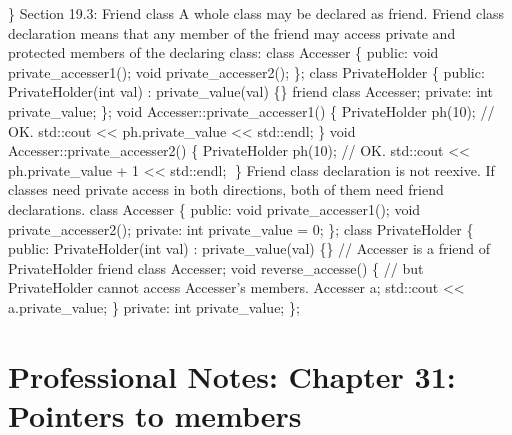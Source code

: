 \} Section 19.3: Friend class A whole class may be declared as friend.
Friend class declaration means that any member of the friend may access
private and protected members of the declaring class: class Accesser \{
public: void private\_accesser1(); void private\_accesser2(); \}; class
PrivateHolder \{ public: PrivateHolder(int val) : private\_value(val)
\{\} friend class Accesser; private: int private\_value; \}; void
Accesser::private\_accesser1() \{ PrivateHolder ph(10); // OK. std::cout
\textless\textless{} ph.private\_value \textless\textless{} std::endl;
\} void Accesser::private\_accesser2() \{ PrivateHolder ph(10); // OK.
std::cout \textless\textless{} ph.private\_value + 1
\textless\textless{} std::endl; \} Friend class declaration is not
reexive. If classes need private access in both directions, both of them
need friend declarations. class Accesser \{ public: void
private\_accesser1(); void private\_accesser2(); private: int
private\_value = 0; \}; class PrivateHolder \{ public: PrivateHolder(int
val) : private\_value(val) \{\} // Accesser is a friend of PrivateHolder
friend class Accesser; void reverse\_accesse() \{ // but PrivateHolder
cannot access Accesser's members. Accesser a; std::cout
\textless\textless{} a.private\_value; \} private: int private\_value;
\};

\hypertarget{professional-notes-chapter-31-pointers-to-members-1}{%
\chapter{Professional Notes: Chapter 31: Pointers to
members}\label{professional-notes-chapter-31-pointers-to-members-1}}

